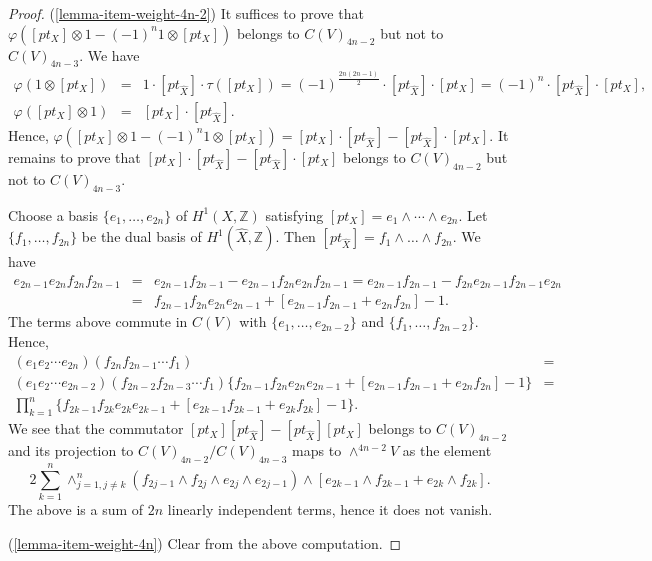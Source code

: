 \documentclass[12pt]{amsart}
\numberwithin{equation}{subsection}
\theoremstyle{plain}
\theoremstyle{definition}
\newcommand{\ZZ}{{\mathbb Z}}
\begin{document}
 \begin{proof}
 (\ref{lemma-item-weight-4n-2})
 It suffices to prove that $\varphi([pt_{X}]\otimes 1-(-1)^n1\otimes[pt_{X}])$
 belongs to $C(V)_{4n-2}$ but not to $C(V)_{4n-3}$. We have
 \begin{eqnarray*}
 \varphi(1\otimes[pt_X])&=&1\cdot[pt_{\hat{X}}]\cdot \tau([pt_X])=(-1)^{\frac{2n(2n-1)}{2}}\cdot[pt_{\hat{X}}]\cdot [pt_X]
 =(-1)^n\cdot[pt_{\hat{X}}]\cdot [pt_X],
 \\
 \varphi([pt_{X}]\otimes 1)&=&[pt_X]\cdot [pt_{\hat{X}}].
 \end{eqnarray*}
 Hence, $\varphi([pt_{X}]\otimes 1-(-1)^n1\otimes[pt_{X}])=[pt_X]\cdot[pt_{\hat{X}}]-[pt_{\hat{X}}]\cdot [pt_X]$. It remains to prove that $[pt_X]\cdot[pt_{\hat{X}}]-[pt_{\hat{X}}]\cdot [pt_X]$ belongs to 
 $C(V)_{4n-2}$ but not to $C(V)_{4n-3}$.

Choose a basis $\{e_1, \dots, e_{2n}\}$ of $H^1(X,\ZZ)$ satisfying $[pt_X]=e_1\wedge \cdots\wedge e_{2n}$.
Let $\{f_1, \dots, f_{2n}\}$ be the dual basis of $H^1(\hat{X},\ZZ)$. Then $[pt_{\hat{X}}]=f_1\wedge \dots\wedge f_{2n}.$
We have
\begin{eqnarray*}
e_{2n-1}e_{2n}f_{2n}f_{2n-1}&=& e_{2n-1}f_{2n-1}-e_{2n-1}f_{2n}e_{2n}f_{2n-1}=
e_{2n-1}f_{2n-1}-f_{2n}e_{2n-1}f_{2n-1}e_{2n}
\\
&=&f_{2n-1}f_{2n}e_{2n}e_{2n-1}+[e_{2n-1}f_{2n-1}+e_{2n}f_{2n}]-1.
\end{eqnarray*}
The terms above commute in $C(V)$ with $\{e_1, \dots, e_{2n-2}\}$ and $\{f_1, \dots, f_{2n-2}\}$. Hence,
\[
\begin{array}{lc}
(e_1e_2\cdots e_{2n})(f_{2n}f_{2n-1}\cdots f_1)&=
\\
(e_1e_2\cdots e_{2n-2})(f_{2n-2}f_{2n-3}\cdots f_1)\{f_{2n-1}f_{2n}e_{2n}e_{2n-1}+[e_{2n-1}f_{2n-1}+e_{2n}f_{2n}]-1\} &=
\\
\prod_{k=1}^n \{f_{2k-1}f_{2k}e_{2k}e_{2k-1}+[e_{2k-1}f_{2k-1}+e_{2k}f_{2k}]-1\}.
\end{array}
\]
We see that the commutator $[pt_X][pt_{\hat{X}}]-[pt_{\hat{X}}][pt_X]$ belongs to $C(V)_{4n-2}$ and its projection to
$C(V)_{4n-2}/C(V)_{4n-3}$ maps to $\wedge^{4n-2}V$ as the element
\[
2\sum_{k=1}^n
\wedge_{j=1,j\neq k}^n \left(f_{2j-1}\wedge f_{2j}\wedge e_{2j}\wedge e_{2j-1}
\right)\wedge \left[
e_{2k-1}\wedge f_{2k-1}+e_{2k}\wedge f_{2k}
\right].
\]
The above is a sum of $2n$ linearly independent terms, hence it does not vanish.

(\ref{lemma-item-weight-4n})
Clear from the above computation.
 \end{proof}
 
\end{document}
